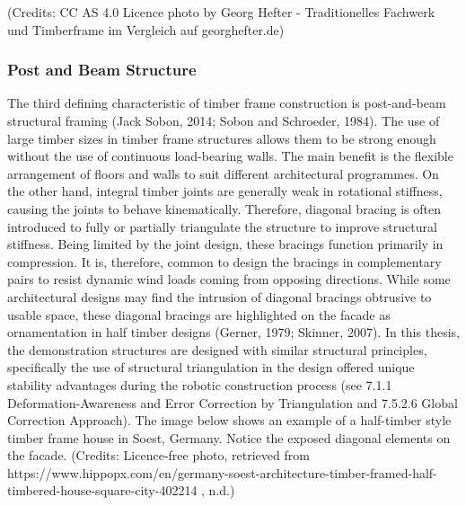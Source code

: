 (Credits: CC AS 4.0 Licence photo by Georg Hefter - Traditionelles Fachwerk und Timberframe im Vergleich auf georghefter.de)

\subsubsection{Post and Beam Structure}
The third defining characteristic of timber frame construction is post-and-beam structural framing (Jack Sobon, 2014; Sobon and Schroeder, 1984). The use of large timber sizes in timber frame structures allows them to be strong enough without the use of continuous load-bearing walls. The main benefit is the flexible arrangement of floors and walls to suit different architectural programmes. 
On the other hand, integral timber joints are generally weak in rotational stiffness, causing the joints to behave kinematically. Therefore, diagonal bracing is often introduced to fully or partially triangulate the structure to improve structural stiffness. Being limited by the joint design, these bracings function primarily in compression. It is, therefore, common to design the bracings in complementary pairs to resist dynamic wind loads coming from opposing directions. While some architectural designs may find the intrusion of diagonal bracings obtrusive to usable space, these diagonal bracings are highlighted on the facade as ornamentation in half timber designs \cite{@gernerFachwerkEntwicklungGefuege1979} (Gerner, 1979; Skinner, 2007). In this thesis, the demonstration structures are designed with similar structural principles, specifically the use of structural triangulation in the design offered unique stability advantages during the robotic construction process (see 7.1.1 Deformation-Awareness and Error Correction by Triangulation and 7.5.2.6 Global Correction Approach).
The image below shows an example of a half-timber style timber frame house in Soest, Germany. Notice the exposed diagonal elements on the facade.
(Credits: Licence-free photo, retrieved from https://www.hippopx.com/en/germany-soest-architecture-timber-framed-half-timbered-house-square-city-402214 , n.d.)
